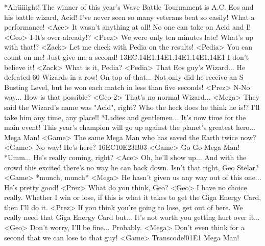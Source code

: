 *Alriiiiight! 
The winner of this year's Wave Battle Tournament 
is A.C. Eos and his battle wizard, Acid! 
I've never seen so many veterans beat so easily! What a performance! 
<Ace> It wasn't anything at all! 
No one can take on Acid and I! 
<Geo> I-It's over already!? 
<Prez> We were only ten minutes late! What's up with that!? 
<Zack> Let me check with Pedia on the results! 
<Pedia> You can count on me! Just give me a second! 
{13}{EC}.{14}{E1}.{14}{E1}.{14}{E1}.{14}{E1}.{14}{E1} 
I don't believe it! 
<Zack> What is it, Pedia? 
<Pedia> That Eos guy's Wizard... 
He defeated 60 Wizards in a row! 
On top of that... 
Not only did he receive an S Busting Level, but he 
won each match in less than five seconds! 
<Prez> N-No way... How is that possible? 
<Geo-2> That's no normal Wizard... 
<Mega> They said the Wizard's name was "Acid", right? 
Who the heck does he think he is!? I'll take him any time, any place!! 
*Ladies and gentlemen... It's now time for the main event! 
This year's champion will go up against the planet's greatest hero... 
Mega Man! 
<Game> The same Mega Man who has saved the Earth twice now? 
<Game> No way! He's here? 
{16}{EC}{10}{E2}{3B}{03} 
<Game> Go Go Mega Man! 
*Umm... He's really coming, right? 
<Ace> Oh, he'll show up... 
And with the crowd this excited there's no way he 
can back down. Isn't that right, Geo Stelar? 
<Game> *munch, munch* 
<Mega> He hasn't given us any way out of this one... He's pretty good! 
<Prez> What do you think, Geo? 
<Geo> I have no choice really. 
Whether I win or lose, if this is what it takes to 
get the Giga Energy Card, then I'll do it. 
<Prez> If you think you're going to lose, get out of here. 
We really need that Giga Energy Card but... 
It's not worth you getting hurt over it... 
<Geo> Don't worry, I'll be fine... Probably. 
<Mega> Don't even think for a second that we can lose to that guy! 
<Game> Transcode!{01}{E1} Mega Man! 
